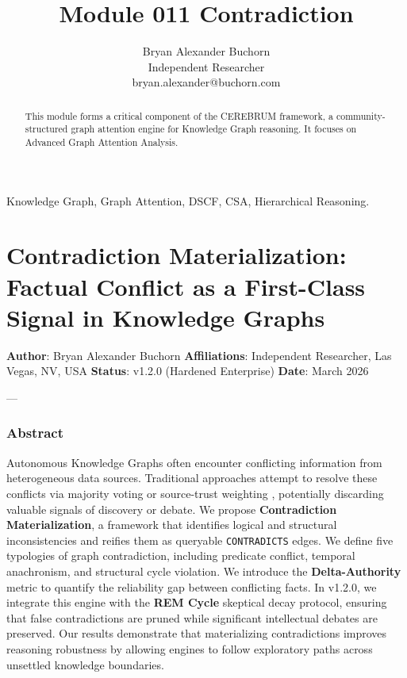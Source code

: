 \documentclass[10pt,journal,compsoc]{IEEEtran}
\begin{document}
\title{Module 011 Contradiction}
\author{Bryan Alexander Buchorn \\ Independent Researcher \\ bryan.alexander@buchorn.com}

\maketitle

\begin{abstract}
This module forms a critical component of the CEREBRUM framework, a community-structured graph attention engine for Knowledge Graph reasoning. It focuses on Advanced Graph Attention Analysis.
\end{abstract}

\begin{IEEEkeywords}
Knowledge Graph, Graph Attention, DSCF, CSA, Hierarchical Reasoning.
\end{IEEEkeywords}

\section{Contra\-diction Materi\-alization: Factual Conflict as a First-Class Signal in Knowledge Graphs}

\textbf{Author}: Bryan Alexander Buchorn  
\textbf{Affili\-ations}: Independent Researcher, Las Vegas, NV, USA  
\textbf{Status}: v1.2.0 (Hardened Enterprise)  
\textbf{Date}: March 2026

---

\subsubsection{Abstract}
Autonomous Knowledge Graphs often encounter conflicting information from heter\-ogeneous data sources. Traditional approaches attempt to resolve these conflicts via majority voting or source-trust weighting \cite{dong2014knowledgevault, bertossi2011database}, potentially discarding valuable signals of discovery or debate. We propose \textbf{Contra\-diction Materi\-alization}, a framework that identifies logical and structural incon\-sistencies and reifies them as queryable \texttt{CONTRADICTS} edges. We define five typologies of graph contr\-adiction, including predicate conflict, temporal anachronism, and structural cycle violation. We introduce the \textbf{Delta-Authority} metric to quantify the reliability gap between conflicting facts. In v1.2.0, we integrate this engine with the \textbf{REM Cycle} skeptical decay protocol, ensuring that false contr\-adictions are pruned while significant intel\-lectual debates are preserved. Our results demonstrate that mater\-ializing contr\-adictions improves reasoning robustness by allowing engines to follow exploratory paths across unsettled knowledge boundaries.
\end{document}
